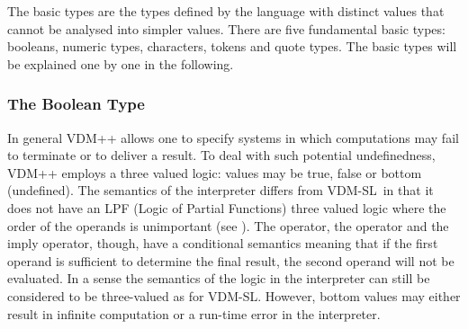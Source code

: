 \documentclass[\pformat,12pt]{article}
\newcommand{\vdmslpp}[2]{%
#2
}
\newcommand{\vdmsl}{VDM-SL}
\newcommand{\vdmpp}{VDM++}
\begin{document}
The basic types are the types defined by the language with distinct
values that cannot be analysed into simpler values. There are five
fundamental basic types: booleans, numeric types,
characters, tokens and quote types. The basic types will be explained one by
one in the following.

\subsubsection{The Boolean Type}\label{bool}

In general \vdmslpp{\vdmsl}{\vdmpp} allows one to specify systems in
which computations may fail to terminate or to deliver a result. To
deal with such potential undefinedness, 
\vdmslpp{\vdmsl}{\vdmpp} employs a three valued logic: values may be
true, false or bottom (undefined). 
The semantics of the interpreter differs from \vdmsl\ in that it does
not have an LPF (Logic of Partial Functions) three valued logic where
the order of the operands is  
unimportant (see \cite{Jones90a}).  The  operator, the
 operator and the imply operator, though, have a conditional
semantics meaning that if the first operand is sufficient to determine
the final result, the second operand will not be evaluated. In a sense
the semantics of the logic in the interpreter can still be considered
to be three-valued as for VDM-SL. However, bottom values may
either result in infinite computation or a run-time error in the
interpreter.
\end{document}
